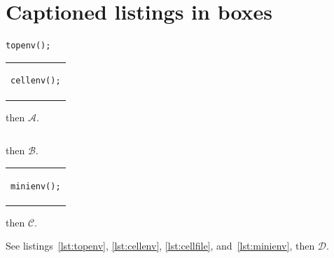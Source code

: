 \documentclass{article}
\begin{document}
\section{Captioned listings in boxes}
\begin{lstlisting}[caption={Top env},label={lst:topenv}]
topenv();
\end{lstlisting}

\begin{tabular}{l}
\begin{lstlisting}[caption={Cell env},label={lst:cellenv}]
cellenv();
\end{lstlisting}
\end{tabular} then $\mathcal{A}$.

\begin{tabular}{l}  \end{tabular} then $\mathcal{B}$.

\begin{tabular}{l} \begin{minipage}{12em}
\begin{lstlisting}[caption={Mini env},label={lst:minienv}]
minienv();
\end{lstlisting}
\end{minipage} \end{tabular} then $\mathcal{C}$.

See listings~\ref{lst:topenv}, \ref{lst:cellenv}, \ref{lst:cellfile}, and~\ref{lst:minienv}, then $\mathcal{D}$.
\end{document}
